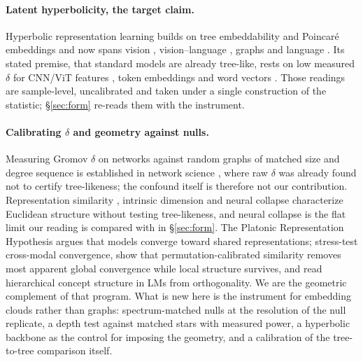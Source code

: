 \documentclass{article}
\begin{document}
\paragraph{Latent hyperbolicity, the target claim.} Hyperbolic representation learning builds on tree embeddability \citep{sarkar2011low} and Poincar\'{e} embeddings \citep{nickel2017poincare, ganea2018hyperbolic} and now spans vision \citep{Khrulkov_2020_CVPR, ermolov2022hyperbolic, atigh2022hyperbolic, bdeir2024fully}, vision--language \citep{desai2023meru, pal2025compositional}, graphs \citep{chami2019hyperbolic} and language \citep{chen2022fully, he2026helm, sinha2024learning}. Its stated premise, that standard models are already tree-like, rests on low measured $\delta$ for CNN/ViT features \citep{Khrulkov_2020_CVPR, bdeir2024fully}, token embeddings \citep{yang2025hyperbolic} and word vectors \citep{tifrea2019poincare}. Those readings are sample-level, uncalibrated and taken under a single construction of the statistic; \S\ref{sec:form} re-reads them with the instrument.

\paragraph{Calibrating $\delta$ and geometry against nulls.} Measuring Gromov $\delta$ on networks against random graphs of matched size and degree sequence is established in network science \citep{narayan2011curvature, kennedy2013hyperbolicity, adcock2013treelike}, where raw $\delta$ was already found not to certify tree-likeness; the confound itself is therefore not our contribution. Representation similarity \citep{kornblith2019cka}, intrinsic dimension \citep{ansuini2019intrinsic, pope2021intrinsic} and neural collapse \citep{papyan2020prevalence} characterize Euclidean structure without testing tree-likeness, and neural collapse is the flat limit our reading is compared with in \S\ref{sec:form}. The Platonic Representation Hypothesis \citep{huh2024platonic} argues that models converge toward shared representations; \citet{koepke2026cave} stress-test cross-modal convergence, \citet{groger2026aristotelian} show that permutation-calibrated similarity removes most apparent global convergence while local structure survives, and \citet{park2024geometry} read hierarchical concept structure in LMs from orthogonality. We are the geometric complement of that program. What is new here is the instrument for embedding clouds rather than graphs: spectrum-matched nulls at the resolution of the null replicate, a depth test against matched stars with measured power, a hyperbolic backbone as the control for imposing the geometry, and a calibration of the tree-to-tree comparison itself.
\end{document}

